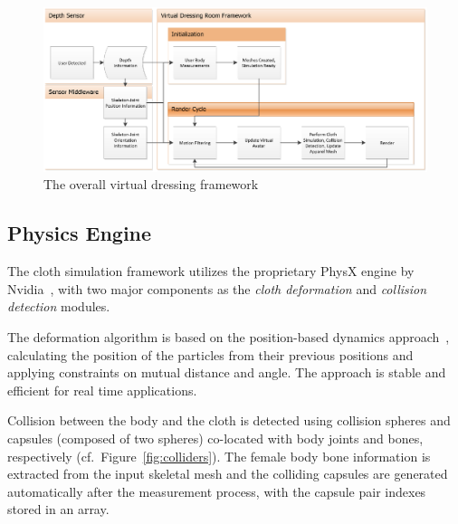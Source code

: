 \documentclass[number,preprint,review,12pt]{elsarticle}
\begin{document}
\begin{figure}[htbp]
	\centerline{
	\includegraphics[width=1.0\textwidth]{./figures/overall.eps}
	}
	\caption{The overall virtual dressing framework}
	\label{fig:overall}
\end{figure}

\subsection{Physics Engine}
\label{subsec:Physics}
The cloth simulation framework utilizes the proprietary PhysX engine by Nvidia~\cite{Kim2011}, with two major components as the {\em cloth deformation} and {\em collision detection} modules. 

The deformation algorithm is based on the position-based dynamics approach~\cite{Mullera2007}, calculating the position of the particles from their previous positions and applying constraints on mutual distance and angle. The approach is stable and efficient for real time applications. 

Collision between the body and the cloth is detected using collision spheres and capsules (composed of two spheres) co-located with body joints and bones, respectively (cf.~Figure~\ref{fig:colliders}). The female body bone information is extracted from the input skeletal mesh and the colliding capsules are generated automatically after the measurement process, with the capsule pair indexes stored in an array.
\end{document}
